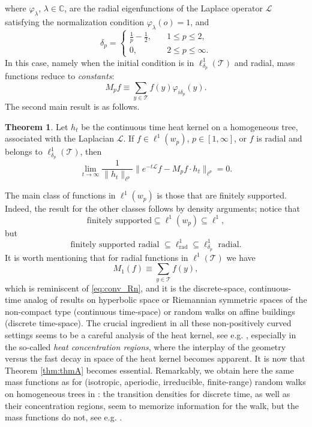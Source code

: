 \documentclass[10pt,a4paper]{amsart}
\renewcommand\mathcal{\mathscr}
\theoremstyle{plain}
\theoremstyle{remark}
\theoremstyle{definition}
\newtheorem{thmx}{Theorem}
\begin{document}
	where $\varphi_{\lambda}$, $\lambda\in \mathbb{C}$, are the radial eigenfunctions of the Laplace operator $\mathcal{L}$ satisfying the normalization condition $\varphi_{\lambda}(o)=1$, and 
    \begin{equation}\label{eq:deltap}
    \delta_p=\begin{cases}
		\frac{1}{p}-\frac{1}{2}, &\quad 1\leq p\leq 2, \\
		0, &\quad 2\leq p\leq \infty.
	\end{cases}
    \end{equation}
In this case, namely when the initial condition is in $ \ell^1_{\delta_p}(\mathcal{T})$ and radial, mass functions reduce to \emph{constants}:
	\begin{equation*}
		M_pf \equiv \sum_{y\in \mathcal{T}} f(y) \varphi_{i\delta_p}(y).
	\end{equation*}
The second main result is as follows.

	\begin{thmx}\label{thm:thmB}
		Let $h_t$ be the continuous time heat kernel on a homogeneous tree, associated with the Laplacian $\mathcal{L}$. 
		If $f \in \ell^1(w_p)$, $p \in [1, \infty]$, or $f$ is radial and 
		belongs to $\ell^1_{\delta_p}(\mathcal{T})$, then
		\[ 
		\lim_{t \to \infty} 
		\frac{1}{\|h_t\|_{\ell^p}}
		\| e^{-t\mathcal{L}}f-M_pf\cdot h_t\|_{\ell^p}=0.
		\]
	\end{thmx}
	The main class of functions in $\ell^1(w_p)$ is those that are finitely supported. Indeed, the result for the other classes follows by density arguments; notice that
	\[
	\text{finitely supported}\subseteq \ell^{1}(w_p)\subseteq \ell^{1},
	\]
	but 
	\[
	\text{finitely supported radial }\subseteq \ell^{1}_{\text{rad}}\subseteq \ell^{1}_{\delta_p}\text{ radial}.
	\]
	It is worth mentioning that for radial functions in $\ell^1(\mathcal{T})$
	we have 
	\[
	M_1(f) \equiv \sum_{y \in \mathcal{T}} f(y),
	\]
	which is reminiscent of \eqref{eq:conv_Rn}, and it is the discrete-space, continuous-time analog of results on hyperbolic space or Riemannian symmetric spaces of the non-compact type (continuous time-space) or random walks on affine buildings (discrete time-space). The crucial ingredient in all these non-positively curved settings seems to be a careful analysis of the heat kernel, see e.g. \cite{AJ99, APZ, P1, PT, T}, especially in the so-called \textit{heat concentration regions}, where the interplay of the geometry versus the fast decay in space of the heat kernel becomes apparent. It is now that Theorem \ref{thm:thmA} becomes essential. Remarkably, we obtain here the same mass functions as for (isotropic, aperiodic, irreducible, finite-range) random walks on homogeneous trees in \cite{PT}: the transition densities for discrete time, as well as their concentration regions, seem to memorize information for the walk, but the mass functions do not, see e.g. \cite{PT, T}.
\end{document}
